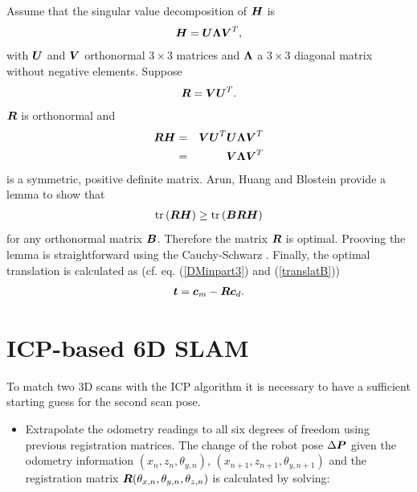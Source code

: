 \documentclass[12pt,dvips]{article}
\renewcommand{\v}[1]{\text{\boldmath $#1$}}
\newcommand{\V}[1]{\text{\boldmath $#1$}}
\newcommand{\M}[1]{\v{#1}}                     %
\newcommand{\trace}[1]{\mbox{tr}\left( #1 \right)}
\begin{document}
{Assume that the singular value decomposition of $\M H$ is
\begin{eqnarray*}
  \M H = \M U \M \Lambda \M V^T,
\end{eqnarray*}
with $\M U$ and $\M V$ orthonormal $3 \times 3$ matrices and $\M
\Lambda$ a $3 \times 3$ diagonal matrix without negative
elements. Suppose
\begin{eqnarray*}
\M R = \M V \M U^T.
\end{eqnarray*}
$\M R$ is orthonormal and
\begin{eqnarray*}
\M R \M H & = & \M V \M U^T \M U \M \Lambda \M V^T \\
& = & \M V \M \Lambda \M V^T
\end{eqnarray*}
is a symmetric, positive definite matrix. Arun, Huang and
Blostein provide a lemma to show that
\begin{eqnarray*}
\trace{\M R \M H} \geq \trace{\M B \M R \M H}
\end{eqnarray*}
for any orthonormal matrix $\M B$. Therefore the matrix $\M R$ is
optimal. Prooving the lemma is straightforward using the
Cauchy-Schwarz \cite{Arun_1987}. Finally, the
optimal translation is calculated as (cf. eq. (\ref{DMinpart3})
and (\ref{translatB}))
\begin{eqnarray*}
\V t = \V c_m - \M R \V c_d.
\end{eqnarray*}


\section{ICP-based 6D SLAM}

To match two 3D scans with the ICP algorithm it is necessary to
have a sufficient starting guess for the second scan pose.

\begin{itemize}
\item
  Extrapolate the odometry readings to all six degrees of freedom
  using previous registration matrices. The change of the robot
  pose $\Delta \M P$ given the odometry information
  $(x_n,z_n,\theta_{y,n})$, $(x_{n+1},z_{n+1},\theta_{y,n+1})$
  and the registration matrix $\M R({\theta_{x,{n}}},
  {\theta_{y,{n}}}, {\theta_{z,{n}}})$ is calculated by solving:
  

\end{itemize}}
\end{document}
